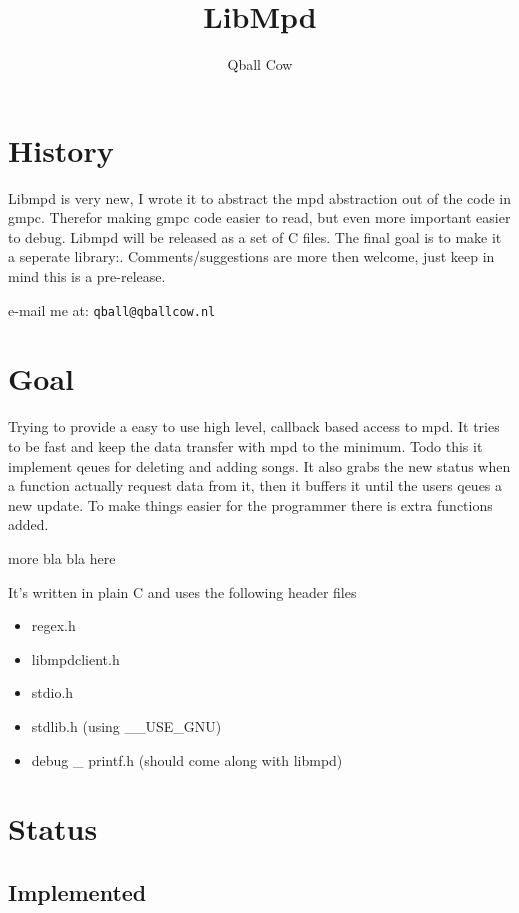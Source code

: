 \documentclass[a4paper,11pt]{article}
\begin{document}
\title{LibMpd} 
\author{Qball Cow}
\maketitle

\section{History}
Libmpd is very new, I wrote it to abstract the mpd abstraction out of the code
in gmpc. Therefor making gmpc code easier to read, but even more important
easier to debug. Libmpd will be released as a set of C files. The final goal is
to make it a seperate library:. Comments/suggestions are more then welcome,
just keep in mind this is a pre-release.

e-mail me at: \verb|qball@qballcow.nl|

\section{Goal}

Trying to provide a easy to use high level, callback based access to mpd. It
tries to be fast and keep the data transfer with mpd to the minimum. 
Todo this it implement qeues for deleting and adding songs. It also grabs the new status when a function actually request data from it, then it buffers it until the users qeues a new update. To make things easier for the programmer there is extra functions added.

{\color{red} more bla bla here}

It's written in plain C and uses the following header files
\begin{itemize}
  \item regex.h
  
  \item libmpdclient.h
  
  \item stdio.h
  
  \item stdlib.h (using  \_\_USE\_GNU)
  
  \item debug \_ printf.h (should come along with libmpd)
\end{itemize}

\section{Status}

\subsection{Implemented}
\end{document}
